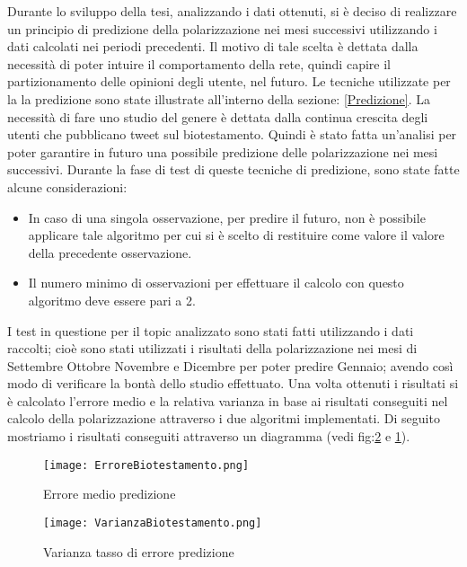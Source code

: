 Durante lo sviluppo della tesi, analizzando i dati ottenuti, si è deciso di realizzare un principio di predizione della polarizzazione nei mesi successivi utilizzando i dati calcolati nei periodi precedenti. Il motivo di tale scelta è dettata dalla necessità di poter intuire il comportamento della rete, quindi capire il partizionamento delle opinioni degli utente, nel futuro. Le tecniche utilizzate per la la predizione sono state illustrate all'interno della sezione: \ref{Predizione}.
La necessità di fare uno studio del genere è dettata dalla continua crescita degli utenti che pubblicano tweet sul biotestamento. Quindi è stato fatta un'analisi per poter garantire in futuro una possibile predizione delle polarizzazione nei mesi successivi.
Durante la fase di test di queste tecniche di predizione, sono state fatte alcune considerazioni:
\begin{itemize}
\item In caso di una singola osservazione, per predire il futuro, non è possibile applicare tale algoritmo per cui si è scelto di restituire come valore il valore della precedente  osservazione.
\item Il numero minimo di osservazioni per effettuare il calcolo con questo algoritmo deve essere pari a 2.
\end{itemize}
I test in questione per il topic analizzato sono stati fatti utilizzando i dati raccolti; cioè sono stati utilizzati i risultati della polarizzazione nei mesi di Settembre Ottobre Novembre e Dicembre per poter predire Gennaio; avendo così modo di verificare la bontà dello studio effettuato.
Una volta ottenuti i risultati si è calcolato l'errore medio e la relativa varianza in base ai risultati conseguiti nel calcolo della polarizzazione attraverso i due algoritmi implementati. Di seguito mostriamo i risultati conseguiti attraverso un diagramma (vedi fig:\ref{predizioneBiotestamento} e \ref{predizioneBiotestamento1}).
\newpage
\begin{figure}[!ht]
\centering
\texttt{[image: ErroreBiotestamento.png]}
\caption{Errore medio predizione}
\label{predizioneBiotestamento1}
\end{figure}
\vspace{10mm}
\begin{figure}[!ht]
\centering
\texttt{[image: VarianzaBiotestamento.png]}
\caption{Varianza tasso di errore predizione}
\label{predizioneBiotestamento}
\end{figure}